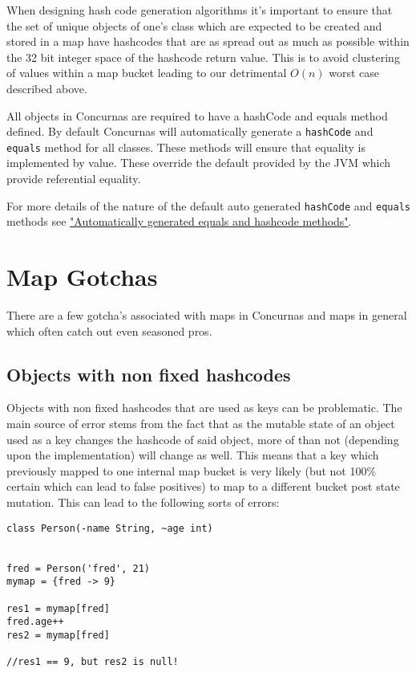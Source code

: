 \documentclass[conc-doc]{subfiles}
\begin{document}
When designing hash code generation algorithms it's important to ensure that the set of unique objects of one's class which are expected to be created and stored in a map have hashcodes that are as spread out as much as possible within the 32 bit integer space of the hashcode return value. This is to avoid clustering of values within a map bucket leading to our detrimental $O(n)$ worst case described above.

All objects in Concurnas are required to have a hashCode and equals method defined. By default Concurnas will automatically generate a \lstinline{hashCode} and \lstinline{equals} method for all classes. These methods will ensure that equality is implemented by value. These override the default provided by the JVM which provide referential equality.

For more details of the nature of the default auto generated \lstinline{hashCode} and \lstinline{equals} methods see \hyperref[autoGeneqAndHash]{"Automatically generated equals and hashcode methods"}.


\section{Map Gotchas}
There are a few gotcha's associated with maps in Concurnas and maps in general which often catch out even seasoned pros. 

\subsection{Objects with non fixed hashcodes}
Objects with non fixed hashcodes that are used as keys can be problematic. The main source of error stems from the fact that as the mutable state of an object used as a key changes the hashcode of said object, more of than not (depending upon the implementation) will change as well. This means that a key which previously mapped to one internal map bucket is very likely (but not 100\% certain which can lead to false positives) to map to a different bucket post state mutation. This can lead to the following sorts of errors:

\begin{lstlisting}
class Person(-name String, ~age int)


fred = Person('fred', 21)
mymap = {fred -> 9}

res1 = mymap[fred]
fred.age++
res2 = mymap[fred]

//res1 == 9, but res2 is null!
\end{lstlisting}
\end{document}
